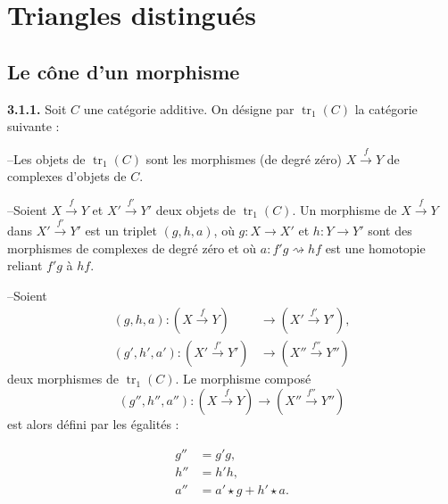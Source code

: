 \clearpage
{}%
\section{Triangles distingués}

\subsection{Le cône d'un morphisme}

\noindent\textbf{3.1.1.}\quad
{}
Soit $C$ une catégorie additive. On désigne par
$\operatorname{tr}_1(C)$ la catégorie suivante :

\noindent--\quad Les objets de $\operatorname{tr}_1(C)$ sont les morphismes
(de degré zéro) $X\xrightarrow{f}Y$ de complexes d'objets de $C$.

\noindent--\quad Soient $X\xrightarrow{f}Y$ et
$X'\xrightarrow{f'}Y'$ deux objets de $\operatorname{tr}_1(C)$. Un morphisme
de $X\xrightarrow{f}Y$ dans $X'\xrightarrow{f'}Y'$ est un triplet
$(g,h,a)$, où $g\colon X\longrightarrow X'$ et
$h\colon Y\longrightarrow Y'$ sont des morphismes de complexes de degré zéro
et où
$a\colon f'g\rightsquigarrow hf$ est une homotopie reliant $f'g$ à $hf$.

\noindent--\quad Soient
\begin{equation*}
  \begin{aligned}
    (g,h,a)\colon (X\xrightarrow{f}Y)
      &\longrightarrow (X'\xrightarrow{f'}Y'),\\
    (g',h',a')\colon (X'\xrightarrow{f'}Y')
      &\longrightarrow (X''\xrightarrow{f''}Y'')
  \end{aligned}
\end{equation*}
deux morphismes de $\operatorname{tr}_1(C)$. Le morphisme composé
\begin{equation*}
  (g'',h'',a'')\colon
  (X\xrightarrow{f}Y)\longrightarrow(X''\xrightarrow{f''}Y'')
\end{equation*}
est alors défini par les égalités :

\begin{equation}
  \begin{aligned}
    g''&=g'g,\\
    h''&=h'h,\\
    a''&=a'\star g+h'\star a.
  \end{aligned}
  \tag{3.1.1.1}
\end{equation}

